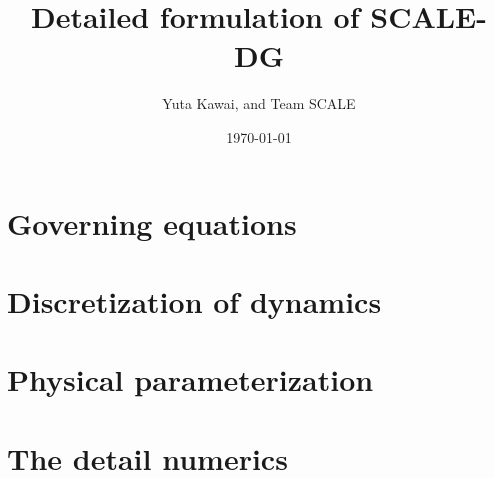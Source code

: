 \documentclass[a4paper,12pt]{report}
\title{{\LARGE Detailed formulation of SCALE-DG}}
\author{Yuta Kawai, and Team SCALE}
\date{\today}
\begin{document}
\maketitle
\tableofcontents



\chapter{Governing equations}


\chapter{Discretization of dynamics}
\label{chap:discretization dynamics}

\newpage

\newpage



\newpage
\chapter{Physical parameterization}


%
\newpage

%
\newpage

%
\newpage

%
\newpage

%
\newpage



\appendix
\chapter{The detail numerics}




\end{document}
